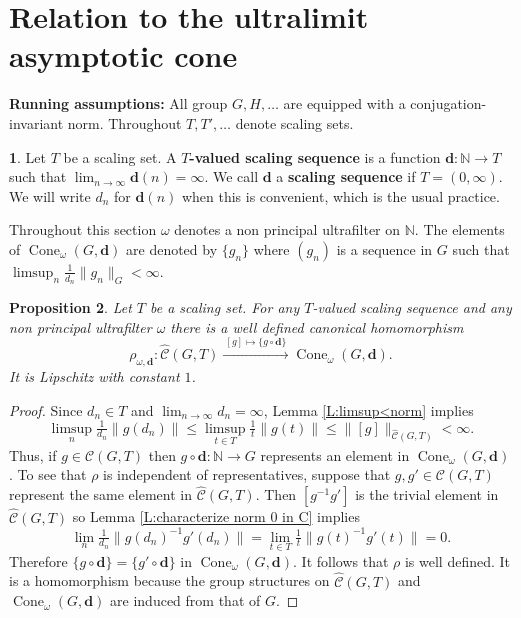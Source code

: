 \documentclass[12pt]{amsart}
\newtheorem{prop}{Proposition}[section]
\theoremstyle{definition}
\newtheorem{void}[prop]{}
\def\NN{\ensuremath{\mathbb{N}}}
\newcommand{\B}[1]{\mathbf{#1}}
\newcommand{\C}[1]{\mathcal{#1}}
\newcommand{\xto}[1]{\xrightarrow{#1}}
\newcommand{\OP}[1]{\operatorname{#1}}
\def\Cone{\OP{Cone}}
\def\tC{\hat{\mathcal{C}}}
\begin{document}
\section{Relation to the ultralimit asymptotic cone}
\label{section:ultrafilter cone}

\noindent
{\bf Running assumptions:}
All group $G,H,\dots$ are equipped with a conjugation-invariant norm.
Throughout $T,T',\dots$ denote scaling sets.


\begin{void}
Let $T$ be a scaling set.
A {\bf $T$-valued scaling sequence} is a function $\B d \colon \NN \to T$ such that $\lim_{n \to \infty} \B d(n)=\infty$.
We call $\B d$ a {\bf scaling sequence} if $T=(0,\infty)$.
We will write $d_n$ for $\B d(n)$ when this is convenient, which is the usual practice. 

Throughout this section $\omega$ denotes a non principal ultrafilter on $\NN$.
The elements of $\Cone_\omega(G,\B d)$ are denoted by $\{g_n\}$ where $(g_n)$ is a sequence in $G$ such that $\limsup_n \tfrac{1}{d_n} \|g_n\|_G < \infty$.
\end{void}


\begin{prop}\label{P:directional into asymptotic}
Let $T$ be a scaling set.
For any $T$-valued scaling sequence and any non principal ultrafilter $\omega$ there is a well defined canonical homomorphism 
\[
\rho_{\omega,\B d} \colon \tC(G,T) \xto{ \ [g] \mapsto \{g \circ \B d\} \ } \Cone_\omega(G,\B d).
\]
It is Lipschitz with constant $1$.
\end{prop}


\begin{proof}
Since $d_n \in T$ and $\lim_{n \to \infty} d_n=\infty$, Lemma \ref{L:limsup<norm} implies
\[
\limsup_n \tfrac{1}{d_n}\|g(d_n)\| \leq
\limsup_{t \in T} \tfrac{1}{t}\|g(t)\| \leq \|[g]\|_{\tC(G,T)} < \infty.
\]
Thus, if $g \in \C C(G,T)$ then $g \circ \B d \colon \NN \to G$ represents an element in $\Cone_{\omega}(G,\B d)$.
To see that $\rho$ is independent of representatives, suppose that $g,g' \in \C C(G,T)$ represent the same element in $\tC(G,T)$.
Then $[g^{-1}g']$ is the trivial element in $\tC(G,T)$ so Lemma \ref{L:characterize norm 0 in C} implies
\[
\lim_n \tfrac{1}{d_n} \| g(d_n)^{-1}g'(d_n)\| = \lim_{t \in T} \tfrac{1}{t}\|g(t)^{-1} g'(t)\|=0.
\]
Therefore $\{g \circ \B d\}=\{ g' \circ \B d\}$ in $\Cone_\omega(G,\B d)$.
It follows that $\rho$ is well defined.
It is a homomorphism because the group structures on $\tC(G,T)$ and $\Cone_\omega(G,\B d)$ are induced from that of $G$.
\end{proof}
\end{document}
